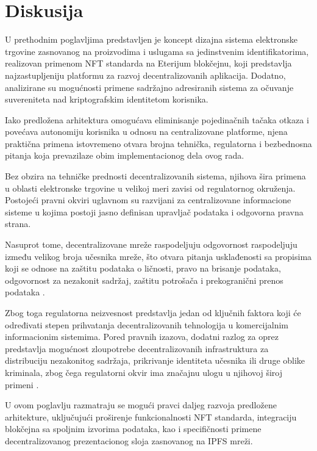 \chapter{Diskusija}
U prethodnim poglavljima predstavljen je koncept dizajna sistema elektronske trgovine zasnovanog na proizvodima i uslugama sa jedinstvenim identifikatorima, realizovan primenom NFT standarda na Eterijum blokčejnu, koji predstavlja najzastupljeniju platformu za razvoj decentralizovanih aplikacija. Dodatno, analizirane su mogućnosti primene sadržajno adresiranih sistema za očuvanje suvereniteta nad kriptografskim identitetom korisnika.

Iako predložena arhitektura omogućava eliminisanje pojedinačnih tačaka otkaza i povećava autonomiju korisnika u odnosu na centralizovane platforme, njena praktična primena istovremeno otvara brojna tehnička, regulatorna i bezbednosna pitanja koja prevazilaze obim implementacionog dela ovog rada.

Bez obzira na tehničke prednosti decentralizovanih sistema, njihova šira primena u oblasti elektronske trgovine u velikoj meri zavisi od regulatornog okruženja. Postojeći pravni okviri uglavnom su razvijani za centralizovane informacione sisteme u kojima postoji jasno definisan upravljač podataka i odgovorna pravna strana.

Nasuprot tome, decentralizovane mreže raspodeljuju odgovornost raspodeljuju između velikog broja učesnika mreže, što otvara pitanja usklađenosti sa propisima koji se odnose na zaštitu podataka o ličnosti, pravo na brisanje podataka, odgovornost za nezakonit sadržaj, zaštitu potrošača i prekogranični prenos podataka \cite{wright2015decentralized}.

Zbog toga regulatorna neizvesnost predstavlja jedan od ključnih faktora koji će određivati stepen prihvatanja decentralizovanih tehnologija u komercijalnim informacionim sistemima. Pored pravnih izazova, dodatni razlog za oprez predstavlja mogućnost zloupotrebe decentralizovanih infrastruktura za distribuciju nezakonitog sadržaja, prikrivanje identiteta učesnika ili druge oblike kriminala, zbog čega regulatorni okvir ima značajnu ulogu u njihovoj široj primeni \cite{europol2026iocta}.

U ovom poglavlju razmatraju se mogući pravci daljeg razvoja predložene arhitekture, uključujući proširenje funkcionalnosti NFT standarda, integraciju blokčejna sa spoljnim izvorima podataka, kao i specifičnosti primene decentralizovanog prezentacionog sloja zasnovanog na IPFS mreži.

